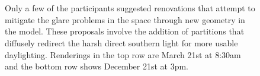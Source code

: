 \begin{figure}[t]
\vspace{-0.277\textwidth}
\begin{small}
\begin{minipage}[b]{\figwidth}~{\color{white}{\bf N2 original}}\end{minipage} 
\begin{minipage}[b]{\figwidth}~{\color{white}{\bf renovation}}\end{minipage}
 \hfill
\begin{minipage}[b]{\figwidth}~{\color{white}{\bf N6 original}}\end{minipage} 
\begin{minipage}[b]{\figwidth}~{\color{white}{\bf renovation}}\end{minipage} 
\hfill
\begin{minipage}[b]{\figwidth}~{\color{white}{\bf A3 original}}\end{minipage} 
\begin{minipage}[b]{\figwidth}~{\color{white}{\bf renovation}}\end{minipage}\\
\end{small}
\vspace{0.19\textwidth}
%
\caption{Only a few of the participants suggested renovations that
  attempt to mitigate the glare problems in the space through new
  geometry in the model.  These proposals involve the addition of
  partitions that diffusely redirect the harsh direct southern light
  for more usable daylighting.
 Renderings in the top row are March 21st at 8:30am and the bottom
  row shows December 21st at 3pm.
%
\label{figure:diffusing_renovations}
}

\vspace{-0.1in}
\end{figure}
%



